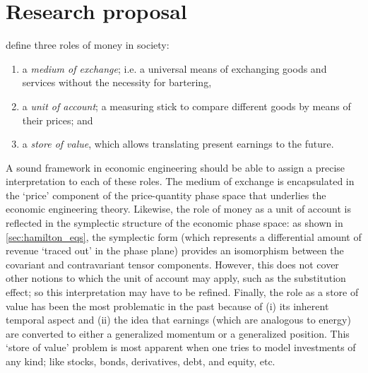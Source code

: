 \chapter{Research proposal}
\label{chap:proposal}
\citet{Mankiw2017} define three roles of money in society:
\begin{enumerate}[itemsep=0.2ex,parsep=0ex,label=(\roman*),topsep=0.2ex]
    \item a \emph{medium of exchange}; i.e. a universal means of exchanging goods and services without the necessity for bartering, 
    \item a \emph{unit of account}; a measuring stick to compare different goods by means of their prices; and
    \item a \emph{store of value}, which allows translating present earnings to the future.
\end{enumerate}
A sound framework in economic engineering should be able to assign  a precise interpretation to each of these roles. The medium of exchange is encapsulated in the `price' component of the price-quantity phase space that underlies the economic engineering theory. Likewise, the role of money as a unit of account is reflected in the symplectic structure of the economic phase space: as shown in \cref{sec:hamilton_eqs}, the symplectic form (which represents a differential amount of revenue `traced out' in the phase plane) provides an isomorphism between the covariant and contravariant tensor components. However, this does not cover other notions to which the unit of account may apply, such as the substitution effect; so this interpretation may have to be refined. Finally, the role as a store of value has been the most problematic in the past because of (i) its inherent temporal aspect and (ii) the idea that earnings (which are analogous to energy) are converted to either a generalized momentum or a generalized position. This `store of value' problem is most apparent when one tries to model investments of any kind; like stocks, bonds, derivatives, debt, and equity, etc.

